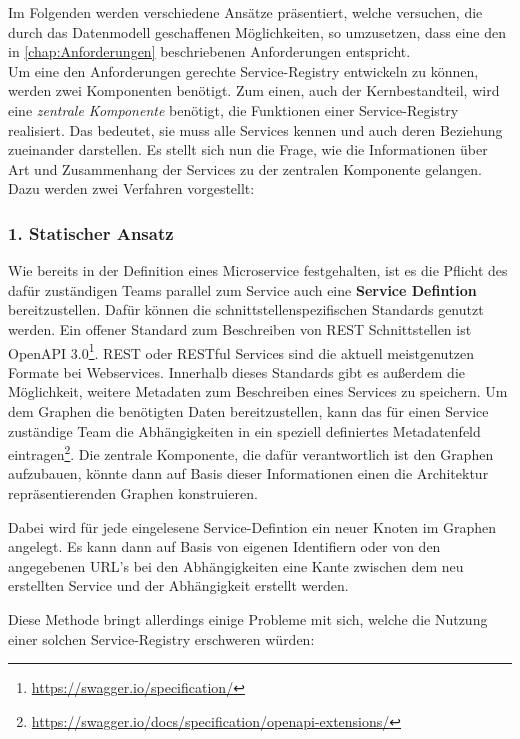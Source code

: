 Im Folgenden werden verschiedene Ansätze präsentiert, welche versuchen, die durch das Datenmodell geschaffenen Möglichkeiten, so umzusetzen, dass eine den in \vref{chap:Anforderungen} beschriebenen Anforderungen entspricht.\\ Um eine den Anforderungen gerechte Service-Registry entwickeln zu können, werden zwei Komponenten benötigt. Zum einen, auch der Kernbestandteil, wird eine \textit{zentrale Komponente} benötigt, die Funktionen einer Service-Registry realisiert. Das bedeutet, sie muss alle Services kennen und auch deren Beziehung zueinander darstellen. Es stellt sich nun die Frage, wie die Informationen über Art und Zusammenhang der Services zu der zentralen Komponente gelangen. Dazu werden zwei Verfahren vorgestellt:

\subsubsection*{1. Statischer Ansatz}
Wie bereits in der Definition eines Microservice festgehalten, ist es die Pflicht des dafür zuständigen Teams parallel zum Service auch eine \textbf{Service Defintion} bereitzustellen. Dafür können die schnittstellenspezifischen Standards genutzt werden. Ein offener Standard zum Beschreiben von REST Schnittstellen ist OpenAPI 3.0\footnote{\url{https://swagger.io/specification/}}. REST oder RESTful Services sind die aktuell meistgenutzen Formate bei Webservices. Innerhalb dieses Standards gibt es außerdem die Möglichkeit, weitere Metadaten zum Beschreiben eines Services zu speichern. Um dem Graphen die benötigten Daten bereitzustellen, kann das für einen Service zuständige Team die Abhängigkeiten in ein speziell definiertes Metadatenfeld eintragen\footnote{\url{https://swagger.io/docs/specification/openapi-extensions/}}. Die zentrale Komponente, die dafür verantwortlich ist den Graphen aufzubauen, könnte dann auf Basis dieser Informationen einen die Architektur repräsentierenden Graphen konstruieren. 

Dabei wird für jede eingelesene Service-Defintion ein neuer Knoten im Graphen angelegt. Es kann dann auf Basis von eigenen Identifiern oder von den angegebenen URL's bei den Abhängigkeiten eine Kante zwischen dem neu erstellten Service und der Abhängigkeit erstellt werden.


Diese Methode bringt allerdings einige Probleme mit sich, welche die Nutzung einer solchen Service-Registry erschweren würden:


